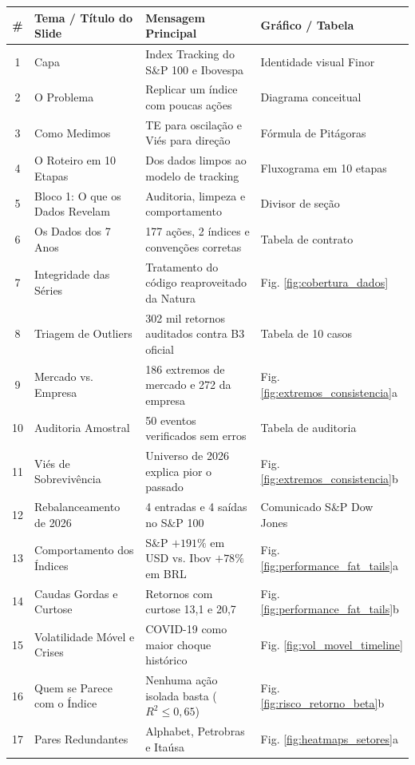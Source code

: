 \documentclass[11pt,a4paper]{article}
\begin{document}
\begin{longtable}{c p{} p{} p{}}
\toprule
\textbf{\#} & \textbf{Tema / Título do Slide} & \textbf{Mensagem Principal} & \textbf{Gráfico / Tabela} \\
\midrule
\endhead
1 & Capa & Index Tracking do S\&P 100 e Ibovespa & Identidade visual Finor \\
2 & O Problema & Replicar um índice com poucas ações & Diagrama conceitual \\
3 & Como Medimos & TE para oscilação e Viés para direção & Fórmula de Pitágoras \\
4 & O Roteiro em 10 Etapas & Dos dados limpos ao modelo de tracking & Fluxograma em 10 etapas \\
5 & Bloco 1: O que os Dados Revelam & Auditoria, limpeza e comportamento & Divisor de seção \\
6 & Os Dados dos 7 Anos & 177 ações, 2 índices e convenções corretas & Tabela de contrato \\
7 & Integridade das Séries & Tratamento do código reaproveitado da Natura & Fig. \ref{fig:cobertura_dados} \\
8 & Triagem de Outliers & 302 mil retornos auditados contra B3 oficial & Tabela de 10 casos \\
9 & Mercado vs. Empresa & 186 extremos de mercado e 272 da empresa & Fig. \ref{fig:extremos_consistencia}a \\
10 & Auditoria Amostral & 50 eventos verificados sem erros & Tabela de auditoria \\
11 & Viés de Sobrevivência & Universo de 2026 explica pior o passado & Fig. \ref{fig:extremos_consistencia}b \\
12 & Rebalanceamento de 2026 & 4 entradas e 4 saídas no S\&P 100 & Comunicado S\&P Dow Jones \\
13 & Comportamento dos Índices & S\&P $+191\%$ em USD vs. Ibov $+78\%$ em BRL & Fig. \ref{fig:performance_fat_tails}a \\
14 & Caudas Gordas e Curtose & Retornos com curtose 13,1 e 20,7 & Fig. \ref{fig:performance_fat_tails}b \\
15 & Volatilidade Móvel e Crises & COVID-19 como maior choque histórico & Fig. \ref{fig:vol_movel_timeline} \\
16 & Quem se Parece com o Índice & Nenhuma ação isolada basta ($R^2 \le 0,65$) & Fig. \ref{fig:risco_retorno_beta}b \\
17 & Pares Redundantes & Alphabet, Petrobras e Itaúsa & Fig. \ref{fig:heatmaps_setores}a \\

\end{longtable}
\end{document}
